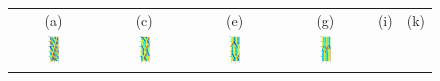 \begin{figure}[t]
\begin{center}
\begin{tabular}{cccccc} (a) & (c) & (e) & (g) & (i) & (k)\\
\includegraphics[width=0.15\textwidth]{figs/ks22rpo016.3-02.86.eps}\hspace{-3ex} &
\includegraphics[width=0.15\textwidth]{figs/ks22rpo033.5-04.04.eps}\hspace{-3ex} &
\includegraphics[width=0.15\textwidth]{figs/ks22rpo047.6-05.68.eps}\hspace{-3ex} &
\includegraphics[width=0.15\textwidth]{figs/ks22rpo071.7-05.50.eps}\hspace{-3ex} &

\end{tabular}
\end{center}
\end{figure}
